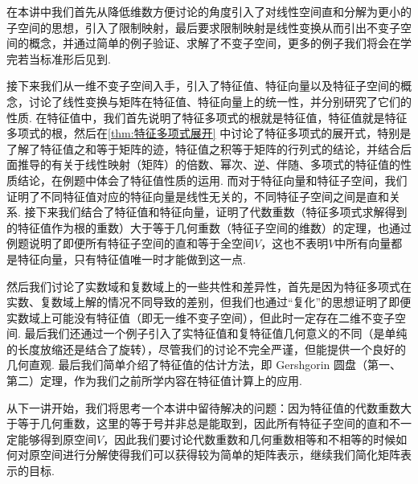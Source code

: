 \begin{summary}

    在本讲中我们首先从降低维数方便讨论的角度引入了对线性空间直和分解为更小的子空间的思想，引入了限制映射，最后要求限制映射是线性变换从而引出不变子空间的概念，并通过简单的例子验证、求解了不变子空间，更多的例子我们将会在学完若当标准形后见到.

    接下来我们从一维不变子空间入手，引入了特征值、特征向量以及特征子空间的概念，讨论了线性变换与矩阵在特征值、特征向量上的统一性，并分别研究了它们的性质. 在特征值中，我们首先说明了特征多项式的根就是特征值，特征值就是特征多项式的根，然后在\autoref{thm:特征多项式展开} 中讨论了特征多项式的展开式，特别是了解了特征值之和等于矩阵的迹，特征值之积等于矩阵的行列式的结论，并结合后面推导的有关于线性映射（矩阵）的倍数、幂次、逆、伴随、多项式的特征值的性质结论，在例题中体会了特征值性质的运用. 而对于特征向量和特征子空间，我们证明了不同特征值对应的特征向量是线性无关的，不同特征子空间之间是直和关系. 接下来我们结合了特征值和特征向量，证明了代数重数（特征多项式求解得到的特征值作为根的重数）大于等于几何重数（特征子空间的维数）的定理，也通过例题说明了即便所有特征子空间的直和等于全空间$V$，这也不表明$V$中所有向量都是特征向量，只有特征值唯一时才能做到这一点.

    然后我们讨论了实数域和复数域上的一些共性和差异性，首先是因为特征多项式在实数、复数域上解的情况不同导致的差别，但我们也通过``复化''的思想证明了即便实数域上可能没有特征值（即无一维不变子空间），但此时一定存在二维不变子空间. 最后我们还通过一个例子引入了实特征值和复特征值几何意义的不同（是单纯的长度放缩还是结合了旋转），尽管我们的讨论不完全严谨，但能提供一个良好的几何直观. 最后我们简单介绍了特征值的估计方法，即 Gershgorin 圆盘（第一、第二）定理，作为我们之前所学内容在特征值计算上的应用.

    从下一讲开始，我们将思考一个本讲中留待解决的问题：因为特征值的代数重数大于等于几何重数，这里的等于号并非总是能取到，因此所有特征子空间的直和不一定能够得到原空间$V$，因此我们要讨论代数重数和几何重数相等和不相等的时候如何对原空间进行分解使得我们可以获得较为简单的矩阵表示，继续我们简化矩阵表示的目标.

\end{summary}

